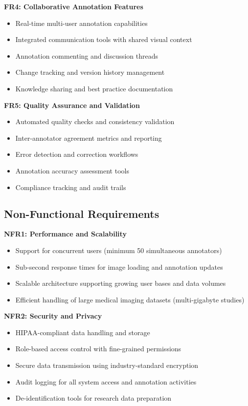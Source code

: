 \textbf{FR4: Collaborative Annotation Features}
\begin{itemize}
    \item Real-time multi-user annotation capabilities
    \item Integrated communication tools with shared visual context
    \item Annotation commenting and discussion threads
    \item Change tracking and version history management
    \item Knowledge sharing and best practice documentation
\end{itemize}

\textbf{FR5: Quality Assurance and Validation}
\begin{itemize}
    \item Automated quality checks and consistency validation
    \item Inter-annotator agreement metrics and reporting
    \item Error detection and correction workflows
    \item Annotation accuracy assessment tools
    \item Compliance tracking and audit trails
\end{itemize}

\subsection{Non-Functional Requirements}

\textbf{NFR1: Performance and Scalability}
\begin{itemize}
    \item Support for concurrent users (minimum 50 simultaneous annotators)
    \item Sub-second response times for image loading and annotation updates
    \item Scalable architecture supporting growing user bases and data volumes
    \item Efficient handling of large medical imaging datasets (multi-gigabyte studies)
\end{itemize}

\textbf{NFR2: Security and Privacy}
\begin{itemize}
    \item HIPAA-compliant data handling and storage
    \item Role-based access control with fine-grained permissions
    \item Secure data transmission using industry-standard encryption
    \item Audit logging for all system access and annotation activities
    \item De-identification tools for research data preparation
\end{itemize}

